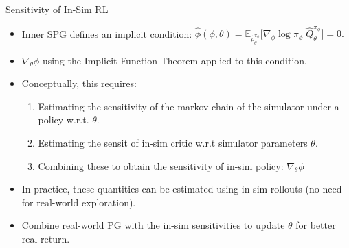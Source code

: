 \documentclass[lecture]{beamer}
\begin{document}
\begin{frame}{\normalsize Sensitivity of In-Sim RL}
\footnotesize

\begin{itemize}
\item Inner SPG defines an implicit condition:
\(\hat\phi(\phi,\theta) = \mathbb{E}_{\hat\rho^{\pi_\phi}_\theta}\!\big[\nabla_\phi \log \pi_\phi \; \hat Q^{\pi_\phi}_\theta\big] = 0.\)
\item \(\nabla_\theta \phi\) using the {Implicit Function Theorem} applied to this condition.
\item Conceptually, this requires:
  \begin{enumerate}\footnotesize
  \item Estimating the sensitivity of the markov chain of the simulator under a policy w.r.t. \(\theta\).
  \item Estimating the sensit of in-sim critic w.r.t simulator parameters \(\theta\).
  \item Combining these to obtain the sensitivity of in-sim policy: \(\nabla_\theta \phi\)
  \end{enumerate}
\item In practice, these quantities can be estimated using in-sim rollouts (no need for real-world exploration).
\item Combine real-world PG with the in-sim sensitivities to update $\theta$ for better real return.
\end{itemize}


\end{frame}
\end{document}
